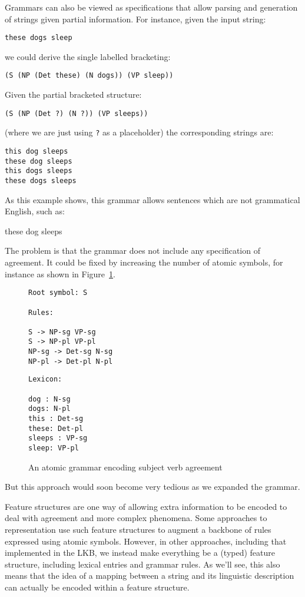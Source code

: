 \documentclass[12pt]{report}
\begin{document}
Grammars can also be viewed as specifications that allow
parsing and generation of strings given partial information.
For instance, given the input string:
\begin{verbatim}
these dogs sleep
\end{verbatim}
we could derive the single labelled bracketing:
\begin{verbatim}
(S (NP (Det these) (N dogs)) (VP sleep))
\end{verbatim}
Given the partial bracketed structure:
\begin{verbatim}
(S (NP (Det ?) (N ?)) (VP sleeps))
\end{verbatim}
(where we are just using {\tt ?}
as a placeholder) the corresponding strings are:
\begin{verbatim}
this dog sleeps
these dog sleeps
this dogs sleeps
these dogs sleeps
\end{verbatim}

As this example shows, this grammar allows
sentences which are not grammatical English, such as:
\begin{ex}
these dog sleeps
\end{ex}
The problem is that the grammar does not include any specification of
agreement.  It could be fixed by increasing the number of atomic symbols,
for instance as shown in Figure~\ref{agratomic}.
\begin{figure}
{\small
\begin{minipage}[t]{3in}
\begin{verbatim}
Root symbol: S

Rules:

S -> NP-sg VP-sg
S -> NP-pl VP-pl
NP-sg -> Det-sg N-sg
NP-pl -> Det-pl N-pl

\end{verbatim}
\end{minipage}
\begin{minipage}[t]{3in}
\begin{verbatim}
Lexicon:

dog : N-sg
dogs: N-pl
this : Det-sg
these: Det-pl
sleeps : VP-sg
sleep: VP-pl
\end{verbatim}
\end{minipage}}
\caption{An atomic grammar encoding subject verb agreement}
\label{agratomic}
\end{figure}
But this approach
would soon become very tedious as we expanded the grammar.

Feature structures are one way of allowing extra information
to be encoded to
deal with agreement and more complex phenomena.  
Some approaches to representation use such feature structures
to augment a backbone of rules expressed using atomic symbols.
However, in other approaches, including that implemented in the
LKB, we instead make everything be a 
(typed) feature structure, including lexical entries
and grammar rules.  As we'll see, this also means that the
idea of a mapping between a string and its linguistic description
can actually be encoded within a feature structure.
\end{document}
